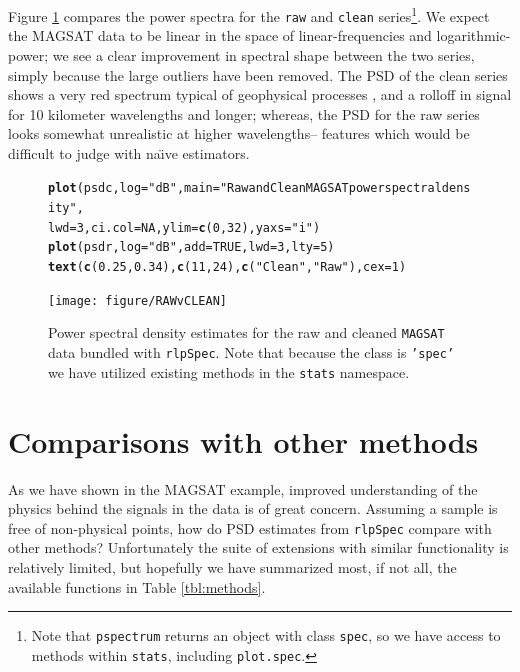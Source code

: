 \documentclass{article}\usepackage{graphicx, color}
\makeatletter
\newcommand{\hlfunctioncall}[1]{\textcolor[rgb]{0.501960784313725,0,0.329411764705882}{\textbf{#1}}}%
\newcommand{\hlstring}[1]{\textcolor[rgb]{0.6,0.6,1}{#1}}%
\newenvironment{kframe}{%
 \def\at@end@of@kframe{}%
 \ifinner\ifhmode%
  \def\at@end@of@kframe{\end{minipage}}%
  \begin{minipage}{\columnwidth}%
 \fi\fi%
 \def\FrameCommand##1{\hskip\@totalleftmargin \hskip-\fboxsep
 \colorbox{shadecolor}{##1}\hskip-\fboxsep
     \hskip-\linewidth \hskip-\@totalleftmargin \hskip\columnwidth}%
 \MakeFramed {\advance\hsize-\width
   \@totalleftmargin\z@ \linewidth\hsize
   \@setminipage}}%
 {\par\unskip\endMakeFramed%
 \at@end@of@kframe}
\newenvironment{knitrout}{}{} %
\newcommand{\Rcmd}[1]{\texttt{#1}}
\newcommand{\rlp}[0]{\Rcmd{rlpSpec}}
\newcommand{\naive}[0]{na\"{\i}ve}
\makeatother
\begin{document}
Figure \ref{fig:pmag} compares the 
power spectra for the \Rcmd{raw} and \Rcmd{clean} 
series\footnote{
Note that \Rcmd{pspectrum} returns
an object with class \Rcmd{spec}, so we have access to methods 
within \Rcmd{stats}, including \Rcmd{plot.spec}.
}.  
We expect the MAGSAT data to be linear in the space of
linear-frequencies and logarithmic-power;
we see a clear
improvement in spectral shape between the two series,
simply because the large outliers have been removed.
The PSD of the clean series shows a
very red spectrum typical of geophysical processes \citep{agnew1992},
and
a rolloff in signal
for 10 kilometer wavelengths and longer; whereas, the 
PSD for the raw series looks somewhat unrealistic at higher wavelengths--
features which would be difficult to judge with \naive{} estimators.
%
\begin{figure}[htb!]
\begin{center}
\begin{knitrout}
\color{fgcolor}\begin{kframe}
\begin{alltt}
\hlfunctioncall{plot}(psdc, log = \hlstring{"dB"}, main = \hlstring{"Raw and Clean MAGSAT power spectral density"}, 
    lwd = 3, ci.col = NA, ylim = \hlfunctioncall{c}(0, 32), yaxs = \hlstring{"i"})
\hlfunctioncall{plot}(psdr, log = \hlstring{"dB"}, add = TRUE, lwd = 3, lty = 5)
\hlfunctioncall{text}(\hlfunctioncall{c}(0.25, 0.34), \hlfunctioncall{c}(11, 24), \hlfunctioncall{c}(\hlstring{"Clean"}, \hlstring{"Raw"}), cex = 1)
\end{alltt}
\end{kframe}
\texttt{[image: figure/RAWvCLEAN]} 

\end{knitrout}

\caption{Power spectral density estimates for the raw and cleaned
             \Rcmd{MAGSAT} data bundled with \rlp{}. Note that
             because the class is \Rcmd{'spec'} we have
             utilized  existing methods in the \Rcmd{stats} namespace.}
\label{fig:pmag}
\end{center}
\end{figure}

\section{Comparisons with other methods}

As we have shown in the MAGSAT example, 
improved understanding of the physics behind the signals in the data
is of great concern.
Assuming a sample is free of non-physical points, how do
PSD estimates from \rlp{}
compare with other methods?
Unfortunately the suite of extensions with similar functionality
is relatively limited, but hopefully we have
summarized most, if not all, the available functions in Table \ref{tbl:methods}.
\end{document}
